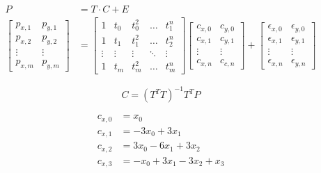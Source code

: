 \begin{align}
    P &= T\cdot C + E \\
    \begin{bmatrix}
        p_{x,1} & p_{y,1} \\ p_{x,2} & p_{y,2} \\ \vdots & \vdots \\ p_{x,m} & p_{y,m}
    \end{bmatrix}
    &=
    \begin{bmatrix}
        1      & t_0     & t_0^2     & \ldots & t_1^n \\
        1      & t_1     & t_1^2     & \ldots & t_2^n \\
        \vdots & \vdots  & \vdots    & \ddots & \vdots \\
        1      & t_m     & t_m^2     & \ldots & t_m^n
    \end{bmatrix}
    \begin{bmatrix}
        c_{x,0} & c_{y,0} \\
        c_{x,1} & c_{y,1} \\
        \vdots  & \vdots \\
        c_{x,n} & c_{c,n}
    \end{bmatrix}
    +
    \begin{bmatrix}
        \epsilon_{x,0} & \epsilon_{y,0} \\
        \epsilon_{x,1} & \epsilon_{y,1} \\
        \vdots         & \vdots \\
        \epsilon_{x,n} & \epsilon_{y,n}
    \end{bmatrix}
\end{align}

\begin{equation}
    C = (T^T T)^{-1} T^T P
\end{equation}

\begin{align*}
    c_{x,0} &= x_0 \\
    c_{x,1} &= -3x_0 + 3x_1 \\
    c_{x,2} &= 3x_0 - 6x_1 + 3x_2 \\
    c_{x,3} &= -x_0 + 3x_1 - 3x_2 + x_3
\end{align*}
